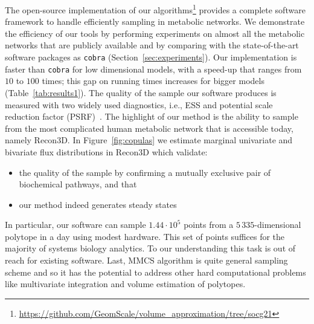    The open-source implementation of our algorithms\footnote{\url{https://github.com/GeomScale/volume_approximation/tree/socg21}} provides a
   complete software framework to handle efficiently sampling in metabolic
   networks. We demonstrate the efficiency of our tools by performing experiments
   on almost all the metabolic networks that are publicly available and by
   comparing with the
   state-of-the-art software packages as \texttt{cobra}
   (Section~\ref{sec:experiments}). Our implementation is faster than \texttt{cobra}
   for low dimensional models,  with a speed-up that ranges from $10$ to $100$ times;
   this gap on running times increases for bigger models
   (Table~\ref{tab:results1}). The quality of the sample our software produces is
   measured with two widely used diagnostics, i.e., ESS and potential scale reduction factor (PSRF)~\citep{Gelman92}. The highlight of
   our method is the ability to sample from the most complicated human metabolic
   network that is accessible today, namely Recon3D. 
   In Figure~\ref{fig:copulas} we estimate marginal univariate and bivariate flux distributions in Recon3D which validate: 
   \begin{itemize}
      \item the  quality of the sample by confirming a mutually exclusive pair of biochemical pathways,
      and that
      \item our method indeed generates steady states
   \end{itemize}
   In particular, our software can sample $1.44\cdot 10^5$ points from a $5\,335$-dimensional polytope in a day
   using modest hardware. This set of points suffices for the majority of systems
   biology analytics.
   To our understanding this task is out of reach for existing software.
   Last, MMCS algorithm is quite general sampling scheme and
   so it has the potential to address other
   hard computational problems like  multivariate integration and volume estimation of polytopes.







